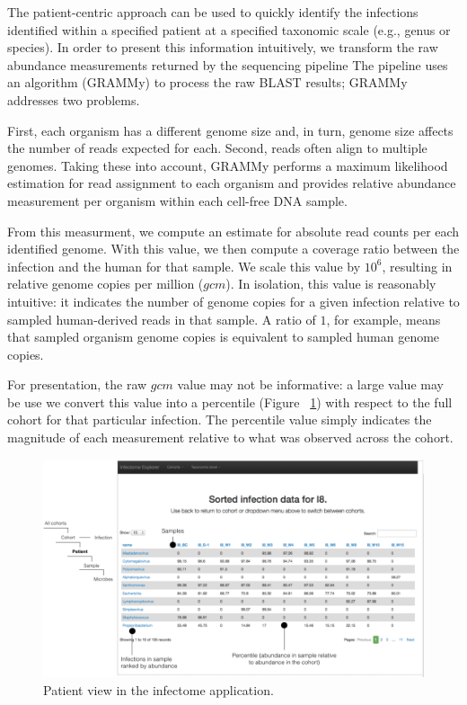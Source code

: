 The patient-centric approach can be used to quickly identify the infections identified within a specified patient at a specified taxonomic scale (e.g., genus or species). In order to present this information intuitively, we transform the raw abundance measurements returned by the sequencing pipeline The pipeline uses an algorithm (GRAMMy) to process the raw BLAST results; GRAMMy addresses two problems. 

First, each organism has a different genome size and, in turn, genome size affects the number of reads expected for each. Second, reads often align to multiple genomes. Taking these into account, GRAMMy performs a maximum likelihood estimation for read assignment to each organism and provides relative abundance measurement per organism within each cell-free DNA sample. 

From this measurment, we compute an estimate for absolute read counts per each identified genome. With this value, we then compute a coverage ratio between the infection and the human for that sample. We scale this value by $10^6$, resulting in relative genome copies per million ($gcm$). In isolation, this value is reasonably intuitive: it indicates the number of genome copies for a given infection relative to sampled human-derived reads in that sample. A ratio of $1$, for example, means that sampled organism genome copies is equivalent to sampled human genome copies. 

For presentation, the raw $gcm$ value may not be informative: a large value may be use we convert this value into a percentile (Figure ~\ref{fig:Fig6}) with respect to the full cohort for that particular infection. The percentile value simply indicates the magnitude of each measurement relative to what was observed across the cohort. 

\begin{figure}
\center\includegraphics[width=150mm,scale=0.5]{Figures/Fig6}
\caption{Patient view in the infectome application.}
\label{fig:Fig6}
\end{figure}


